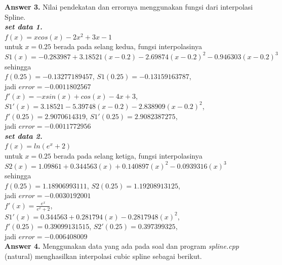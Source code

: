 \documentclass[paper=a4, fontsize=11pt]{scrartcl}
\numberwithin{equation}{section} %
\numberwithin{figure}{section} %
\numberwithin{table}{section} %
\begin{document}
\large \textbf{Answer 3.} Nilai pendekatan dan errornya menggunakan fungsi dari interpolasi Spline.\\
\textit{\textbf{set data 1.}}\\
$f(x) = xcos(x) - 2x^{2} + 3x - 1$ \\
untuk $x = 0.25$ berada pada selang kedua, fungsi interpolasinya\\ 
$S1(x) = -0.283987 + 3.18521(x - 0.2) - 2.69874(x - 0.2)^{2} - 0.946303(x - 0.2)^{3}$\\
sehingga \\
$f(0.25) = -0.13277189457 $, \hspace{2cm} $S1(0.25) = -0.13159163787 $, \\
jadi $error = -0.0011802567$ \\ 

$f'(x) = -xsin(x)+cos(x)-4x+3$,\\
$S1'(x) = 3.18521 - 5.39748(x - 0.2) - 2.838909(x - 0.2)^{2} $, \\
$f'(0.25) = 2.9070614319 $, \hspace{2cm} $S1'(0.25) = 2.9082387275$, \\
jadi $error = -0.0011772956 $\\

\textit{\textbf{set data 2.}}\\
$f(x) = ln(e^{x} + 2)$ \\
untuk $x = 0.25$ berada pada selang ketiga, fungsi interpolasinya\\ 
$S2(x) = 1.09861 + 0.344563(x) + 0.140897(x)^{2} - 0.0939316(x)^{3}$\\
sehingga \\
$f(0.25) = 1.18906993111 $, \hspace{2cm} $S2(0.25) = 1.19208913125 $, \\
jadi $error = -0.0030192001$ \\ 

$f'(x) = \frac{e^{x}}{e^{x} + 2}$,\\
$S1'(x) = 0.344563 + 0.281794(x) - 0.2817948(x)^{2} $, \\
$f'(0.25) = 0.39099131515 $, \hspace{2cm} $S2'(0.25) = 0.397399325 $, \\
jadi $error = -0.006408009 $\\

\newpage
\large \textbf{Answer 4.} Menggunakan data yang ada pada soal dan program \textit{spline.cpp} (natural) menghasilkan interpolasi cubic spline sebagai berikut.\\
\end{document}
